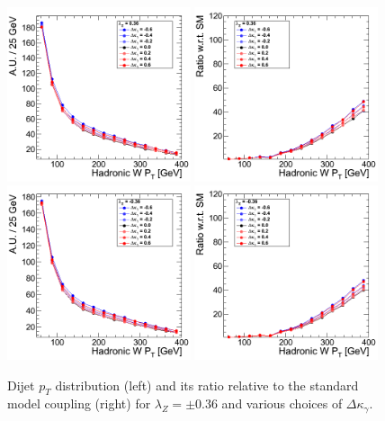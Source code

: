 \begin{figure}[h!t]
  {\centering
    \includegraphics[width=0.48\textwidth]{figs/HadronicWpT_036.png}
    \includegraphics[width=0.48\textwidth]{figs/HadronicWpT_036_ratio.png}
    \includegraphics[width=0.48\textwidth]{figs/HadronicWpT_m036.png}
    \includegraphics[width=0.48\textwidth]{figs/HadronicWpT_m036_ratio.png}
    \caption{Dijet $p_T$ distribution (left) and its ratio relative to 
    the standard model coupling (right) for $\lambda_Z = \pm 0.36$ and various choices of $\Delta{\kappa_\gamma}$.}
    \label{fig:ww_dijetPt_atgcRatio036}}
\end{figure}
